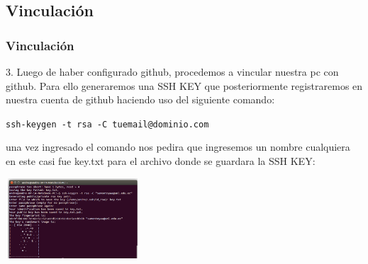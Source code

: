 \documentclass{beamer}
\begin{document}
\subsection{Vinculación}
	\begin{frame}
		\frametitle{Vinculación}
		{\small 3. Luego de haber configurado github, procedemos a vincular nuestra pc con github. Para ello generaremos una SSH KEY que posteriormente registraremos en nuestra cuenta de github haciendo uso del siguiente comando:}
		\begin{center}
			 {\tt \scriptsize ssh-keygen -t rsa -C tuemail@dominio.com}\\
		\end{center}
		{\small una vez ingresado el comando nos pedira que ingresemos un nombre cualquiera en este casi fue key.txt para el archivo donde se guardara la SSH KEY:}
		\begin{center}\includegraphics[width=5cm, height=3cm]{4.png}\end{center}
	\end{frame}
	
\end{document}
